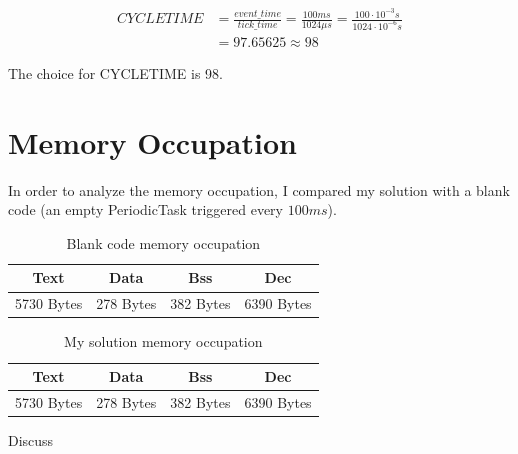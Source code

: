\documentclass[a4paper]{article}
\begin{document}
\begin{align*}
  CYCLETIME & = \frac{event\_time}{tick\_time} = \frac{100ms}{1024\mu s} = \frac{100 \cdot 10^{-3} s}{1024 \cdot 10^{-6} s} \\
            & = 97.65625 \approx 98
\end{align*}

The choice for CYCLETIME is 98.
\section{Memory Occupation}

In order to analyze the memory occupation, I compared my solution with a blank code (an empty PeriodicTask triggered every \(100ms\)).

\begin{table}[h]
  \centering
  \begin{tabular}{|| c || c || c || c ||}
    \hline
    \textbf{Text} & \textbf{Data} & \textbf{Bss} & \textbf{Dec} \\
    \hline
    5730 Bytes    & 278 Bytes     & 382 Bytes    & 6390 Bytes   \\
    \hline
  \end{tabular}
  \caption{Blank code memory occupation}
  \label{Table1}
\end{table}


\begin{table}[h]
  \centering
  \begin{tabular}{|| c || c || c || c ||}
    \hline
    \textbf{Text} & \textbf{Data} & \textbf{Bss} & \textbf{Dec} \\
    \hline
    5730 Bytes    & 278 Bytes     & 382 Bytes    & 6390 Bytes   \\
    \hline
  \end{tabular}
  \caption{My solution memory occupation}
  \label{Table2}
\end{table}

Discuss
\end{document}
